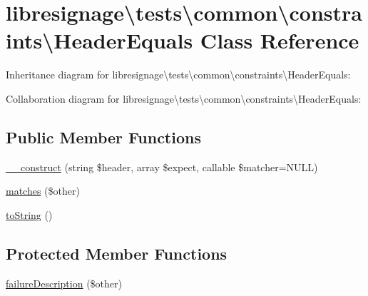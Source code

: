 \hypertarget{classlibresignage_1_1tests_1_1common_1_1constraints_1_1HeaderEquals}{}\section{libresignage\textbackslash{}tests\textbackslash{}common\textbackslash{}constraints\textbackslash{}Header\+Equals Class Reference}
\label{classlibresignage_1_1tests_1_1common_1_1constraints_1_1HeaderEquals}


Inheritance diagram for libresignage\textbackslash{}tests\textbackslash{}common\textbackslash{}constraints\textbackslash{}Header\+Equals\+:


Collaboration diagram for libresignage\textbackslash{}tests\textbackslash{}common\textbackslash{}constraints\textbackslash{}Header\+Equals\+:
\subsection*{Public Member Functions}
\begin{DoxyCompactItemize}
\item 
\hyperlink{classlibresignage_1_1tests_1_1common_1_1constraints_1_1HeaderEquals_a85f006fa3dea5678a0dfaebdd4d154c6}{\+\_\+\+\_\+construct} (string \$header, array \$expect, callable \$matcher=N\+U\+LL)
\item 
\hyperlink{classlibresignage_1_1tests_1_1common_1_1constraints_1_1HeaderEquals_a853c3f5dac611ac86e340a3923fcc2b7}{matches} (\$other)
\item 
\hyperlink{classlibresignage_1_1tests_1_1common_1_1constraints_1_1HeaderEquals_a0aef1a7b0d7758379fec177dfa0059e4}{to\+String} ()
\end{DoxyCompactItemize}
\subsection*{Protected Member Functions}
\begin{DoxyCompactItemize}
\item 
\hyperlink{classlibresignage_1_1tests_1_1common_1_1constraints_1_1HeaderEquals_a75be4a09685fd9129dcea97b716d2952}{failure\+Description} (\$other)
\end{DoxyCompactItemize}
